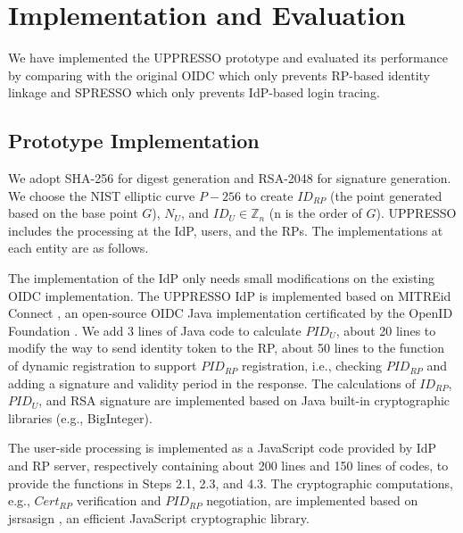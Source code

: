 \section{Implementation and Evaluation}
\label{sec:implementation}
We have implemented the UPPRESSO prototype and evaluated its performance by comparing with the original OIDC which only prevents RP-based identity linkage and SPRESSO which only prevents IdP-based login tracing.

\subsection{Prototype Implementation}
We adopt SHA-256 for digest generation and  RSA-2048 for signature generation. %
We choose the NIST elliptic curve $P-256$ to create $ID_{RP}$ (the point generated based on the base point $G$), $N_U$, and $ID_U \in \mathbb{Z}_n$ (n is the order of $G$).
UPPRESSO includes the processing at the IdP, users, and the RPs.
The implementations at each entity are as follows.

The implementation of the IdP only needs small modifications on the existing OIDC implementation.
The UPPRESSO IdP is implemented based on MITREid Connect \cite{MITREid}, an open-source OIDC Java implementation certificated by the OpenID Foundation \cite{OIDF}.
We add 3 lines of Java code to calculate $PID_U$, about 20 lines to modify the way to send identity token to the RP,
about 50 lines to the function of dynamic registration to support $PID_{RP}$ registration,
 i.e., checking $PID_{RP}$ and adding a signature and validity period in the response.  %
The calculations of $ID_{RP}$, $PID_U$, and RSA signature are implemented based on Java built-in cryptographic libraries (e.g., BigInteger).

The user-side processing is implemented as a JavaScript code provided by IdP and RP server, respectively containing about 200 lines and 150 lines of codes,
to provide the functions in Steps 2.1, 2.3, and 4.3.
The cryptographic computations, e.g., $Cert_{RP}$ verification and $PID_{RP}$ negotiation, are implemented based on jsrsasign \cite{jsrsasign}, an efficient JavaScript cryptographic library.

